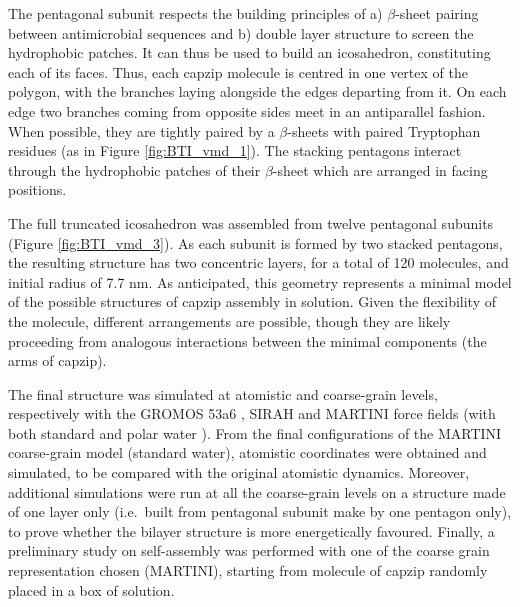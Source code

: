 The pentagonal subunit respects the building principles of a) $\beta$-sheet pairing between antimicrobial sequences and b) double layer structure to screen the hydrophobic patches. It can thus be used to build an icosahedron, constituting each of its faces.
%
Thus, each capzip molecule is centred in one vertex of the polygon, with the branches laying alongside the edges departing from it. On each edge two branches coming from opposite sides meet in an antiparallel fashion. When possible, they are tightly paired by a $\beta$-sheets with paired Tryptophan residues (as in Figure \ref{fig:BTI_vmd_1}). The stacking pentagons interact through the hydrophobic patches of their $\beta$-sheet which are arranged in facing positions.

The full truncated icosahedron was assembled from twelve pentagonal subunits (Figure \ref{fig:BTI_vmd_3}). As each subunit is formed by two stacked pentagons, the resulting structure has two concentric layers, for a total of 120 molecules, and initial radius of 7.7 nm.
%
As anticipated, this geometry represents a minimal model of the possible structures of capzip assembly in solution. Given the flexibility of the molecule, different arrangements are possible, though they are likely proceeding from analogous interactions between the minimal components (the arms of capzip).

The final structure was simulated at atomistic and coarse-grain levels, respectively with the GROMOS 53a6 \citep{Oostenbrink2004}, SIRAH \citep{Machado2018} and MARTINI \citep{Marrink2007, Monticelli2008} force fields (with both standard and polar water \citep{Yesylevskyy2010}).
From the final configurations of the MARTINI coarse-grain model (standard water), atomistic coordinates were obtained and simulated, to be compared with the original atomistic dynamics.
%
Moreover, additional simulations were run at all the coarse-grain levels on a structure made of one layer only (i.e.\ built from pentagonal subunit make by one pentagon only), to prove whether the bilayer structure is more energetically favoured.
%
Finally, a preliminary study on self-assembly was performed with one of the coarse grain representation chosen (MARTINI), starting from molecule of capzip randomly placed in a box of solution.

